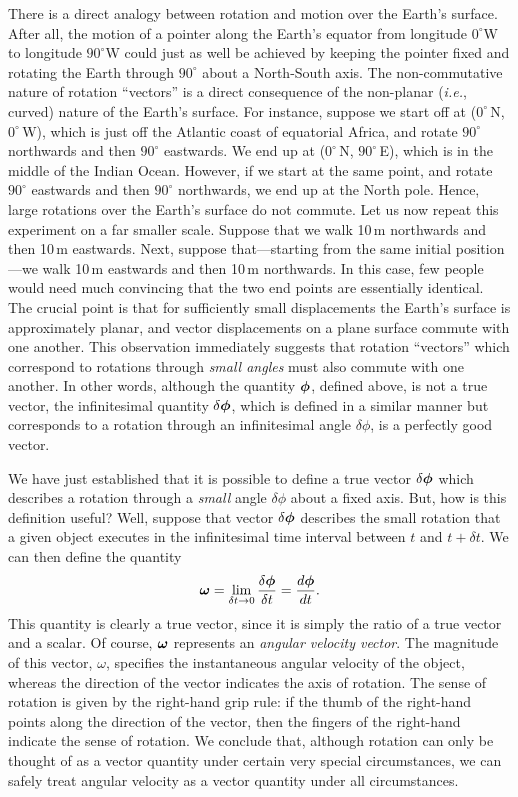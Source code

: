 There is a direct analogy between rotation and motion over the Earth's surface. After
all, the  motion of a pointer along the Earth's equator from longitude $0^\circ$W to
longitude $90^\circ$W could  just as well be achieved by keeping the pointer fixed and
rotating the Earth through $90^\circ$ about a North-South axis. The non-commutative nature
of rotation ``vectors'' is a direct consequence of the non-planar ({\em i.e.}, curved)
nature of the Earth's surface. 
 For instance, suppose we start off at ($0^\circ$\,N, $0^\circ$\,W), which is just off the Atlantic
coast of equatorial Africa, and rotate $90^\circ$ northwards and then  $90^\circ$ eastwards.
We end up at ($0^\circ$\,N, $90^\circ$\,E), which is in the middle of the Indian Ocean. However,
if we start at the same point, and  rotate $90^\circ$ eastwards and then $90^\circ$ northwards,
we end up at the North pole. Hence, large rotations over the Earth's surface do
not commute.
 Let us now repeat this experiment on a far smaller
scale. Suppose that we walk 10\,m northwards and then 10\,m eastwards.
Next, suppose  that---starting from
the same initial position---we walk 10\,m eastwards and then 10\,m northwards. In this case, few people
would need much convincing that  the two end points are essentially identical. The
crucial  point
is that for sufficiently small displacements the Earth's surface is approximately planar, and
vector displacements on a plane surface commute with one another. This observation immediately
suggests that rotation ``vectors'' which correspond to rotations through {\em small angles} 
must also commute with
one another. In other words, although the quantity $\mbox{\boldmath$\phi$}$, defined above, is not a true
vector, the infinitesimal quantity $\delta\mbox{\boldmath$\phi$}$, which is defined in a similar manner but
corresponds to a rotation through an infinitesimal angle $\delta\phi$, is a perfectly good
vector.

We have just established that it is possible to define a true  vector $\delta \mbox{\boldmath$\phi$}$ which
describes a rotation through a {\em small} angle $\delta\phi$ about a fixed axis. But, how is this
definition
useful? Well, suppose that vector $\delta\mbox{\boldmath$\phi$}$ describes the small rotation that a given
object executes in the infinitesimal time interval between $t$ and $t+\delta t$. We can 
then define the quantity
\begin{equation}
\mbox{\boldmath$\omega$} = \lim_{\delta t\rightarrow 0} \frac{\delta\mbox{\boldmath$\phi$}}{\delta t} = \frac{d\mbox{\boldmath$\phi$}}{dt}.
\end{equation}
This quantity is clearly a true vector, since it is simply the ratio of a true vector and
a scalar. Of course, $\mbox{\boldmath$\omega$}$ represents an {\em angular velocity vector}. The
magnitude of this vector, $\omega$, specifies the instantaneous angular velocity of the
object, whereas the direction of the vector indicates the axis of rotation. The sense
of rotation is given by the right-hand grip rule: if the thumb of the right-hand points along
the direction of the vector, then the fingers of the right-hand indicate the sense of rotation.
We conclude that, although rotation can only be thought of as a vector quantity under certain
very special circumstances, we can safely treat angular velocity as a vector
quantity under all circumstances.

